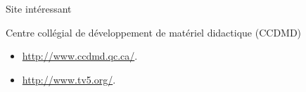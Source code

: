\documentclass[dvips,11pt,xcolor=dvipsnames]{beamer}
\numberwithin{table}{section}
\numberwithin{figure}{section} %
\begin{document}


\begin{frame}{Site intéressant}
 \begin{block}{Centre collégial de développement de matériel didactique (CCDMD)}
    \begin{itemize}
    \item \url{http://www.ccdmd.qc.ca/}.
    \item \url{http://www.tv5.org/}.
    \end{itemize}
  \end{block}
\end{frame}

\end{document}
